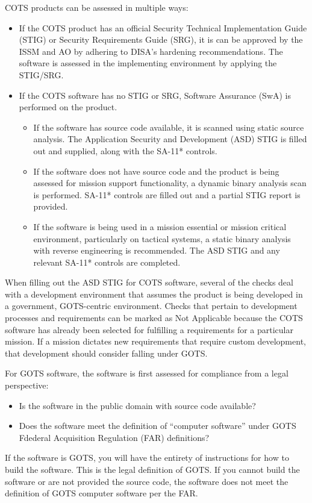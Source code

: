 COTS products can be assessed in multiple ways:
\begin{itemize}
	\item If the COTS product has an official Security Technical Implementation Guide (STIG) or Security Requirements Guide (SRG), it is can be approved by the ISSM and AO by adhering to DISA's hardening recommendations. The software is assessed in the implementing environment by applying the STIG/SRG.
	\item If the COTS software has no STIG or SRG, Software Assurance (SwA) is performed on the product.
	\begin{itemize}
		\item If the software has source code available, it is scanned using static source analysis. The Application Security and Development (ASD) STIG is filled out and supplied, along with the SA-11* controls.
		\item If the software does not have source code and the product is being assessed for mission support functionality, a dynamic binary analysis scan is performed. SA-11* controls are filled out and a partial STIG report is provided.
		\item If the software is being used in a mission essential or mission critical environment, particularly on tactical systems, a static binary analysis with reverse engineering is recommended. The ASD STIG and any relevant SA-11* controls are completed.
	\end{itemize}
\end{itemize}

When filling out the ASD STIG for COTS software, several of the checks deal with a development environment that assumes the product is being developed in a government, GOTS-centric environment. Checks that pertain to development processes and requirements can be marked as Not Applicable because the COTS software has already been selected for fulfilling a requirements for a particular mission. If a mission dictates new requirements that require custom development, that development should consider falling under GOTS.

For GOTS software, the software is first assessed for compliance from a legal perspective:
\begin{itemize}
	\item Is the software in the public domain with source code available?
	\item Does the software meet the definition of ``computer software'' under GOTS Fdederal Acquisition Regulation (FAR) definitions?
\end{itemize}
If the software is GOTS, you will have the entirety of instructions for how to build the software. This is the legal definition of GOTS. If you cannot build the software or are not provided the source code, the software does not meet the definition of GOTS computer software per the FAR.

